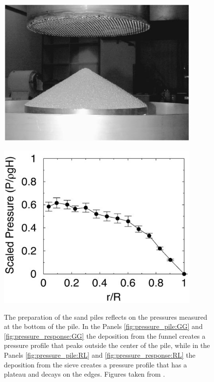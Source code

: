 \begin{figure}
\begin{minipage}{.45\linewidth}
        \includegraphics[width=0.9\textwidth]{04-figuras/Sand_Pile_RL_Experiment.png}
        \label{fig:pressure_pile:RL}
    \end{minipage}
    \begin{minipage}{.45\linewidth}
        \centering
        \includegraphics[width=0.9\textwidth]{04-figuras/Sand_Pile_RL_Pressure.png}
        \label{fig:pressure_response:RL}
    \end{minipage}
    \caption[Effect of the preparation history using funnel and sieve.]{The preparation of the sand piles reflects on the pressures measured at the bottom of the pile. In the Panels \ref{fig:pressure_pile:GG} and \ref{fig:pressure_response:GG} the deposition from the funnel creates a pressure profile that peaks outside the center of the pile, while in the Panels \ref{fig:pressure_pile:RL} and \ref{fig:pressure_response:RL} the deposition from the sieve creates a pressure profile that has a plateau and decays on the edges. Figures taken from \cite{Memories_in_Sand}.}
    \label{fig:pile_stress}
\end{figure}    

